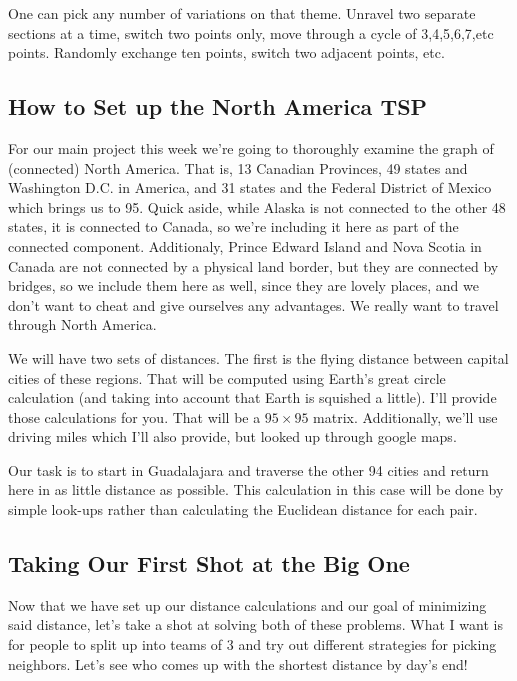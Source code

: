 \documentclass{article}
\theoremstyle{definition}
\theoremstyle{remark}
\begin{document}
One can pick any number of variations on that theme.  Unravel two separate sections at a time, switch two points only, move through a cycle of 3,4,5,6,7,etc points.  Randomly exchange ten points, switch two adjacent points, etc.  


\subsection{How to Set up the North America TSP}

For our main project this week we're going to thoroughly examine the graph of (connected) North America.  That is, 13 Canadian Provinces, 49 states and Washington D.C. in America, and 31 states and the Federal District of Mexico which brings us to 95.  Quick aside, while Alaska is not connected to the other 48 states, it is connected to Canada, so we're including it here as part of the connected component.  Additionaly, Prince Edward Island and Nova Scotia in Canada are not connected by a physical land border, but they are connected by bridges, so we include them here as well, since they are lovely places, and we don't want to cheat and give ourselves any advantages.  We really want to travel through North America.

We will have two sets of distances.  The first is the flying distance between capital cities of these regions. That will be computed using Earth's great circle calculation (and taking into account that Earth is squished a little).  I'll provide those calculations for you.  That will be a $95\times 95$ matrix.  Additionally, we'll use driving miles which I'll also provide, but looked up through google maps.

Our task is to start in Guadalajara and traverse the other 94 cities and return here in as little distance as possible.  This calculation in this case will be done by simple look-ups rather than calculating the Euclidean distance for each pair.

\subsection{Taking Our First Shot at the Big One}

Now that we have set up our distance calculations and our goal of minimizing said distance, let's take a shot at solving both of these problems.  What I want is for people to split up into teams of 3 and try out different strategies for picking neighbors.  Let's see who comes up with the shortest distance by day's end!
\end{document}
